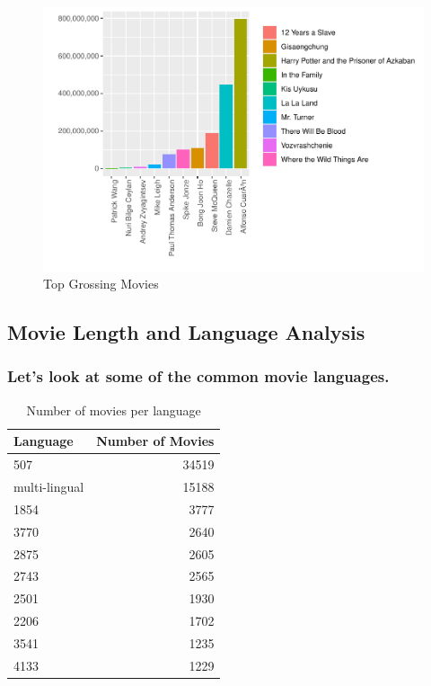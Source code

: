 \documentclass[11pt,a4paper,]{article}
\begin{document}
\begin{figure}[H]

{\centering \includegraphics{Report_files/figure-latex/4-1} 

}

\caption{Top Grossing Movies}\label{fig:4}
\end{figure}

\hypertarget{movie-length-and-language-analysis}{%
\subsection{Movie Length and Language Analysis}\label{movie-length-and-language-analysis}}

\hypertarget{lets-look-at-some-of-the-common-movie-languages.}{%
\subsubsection{Let's look at some of the common movie languages.}\label{lets-look-at-some-of-the-common-movie-languages.}}

\begin{table}[!h]

\caption{\label{tab:langtab}Number of movies per language}
\centering
\begin{tabular}[t]{l|r}
\hline
Language & Number of Movies\\
\hline
\rowcolor{gray!6}  507 & 34519\\
\hline
multi-lingual & 15188\\
\hline
\rowcolor{gray!6}  1854 & 3777\\
\hline
3770 & 2640\\
\hline
\rowcolor{gray!6}  2875 & 2605\\
\hline
2743 & 2565\\
\hline
\rowcolor{gray!6}  2501 & 1930\\
\hline
2206 & 1702\\
\hline
\rowcolor{gray!6}  3541 & 1235\\
\hline
4133 & 1229\\
\hline
\end{tabular}
\end{table}
\end{document}
